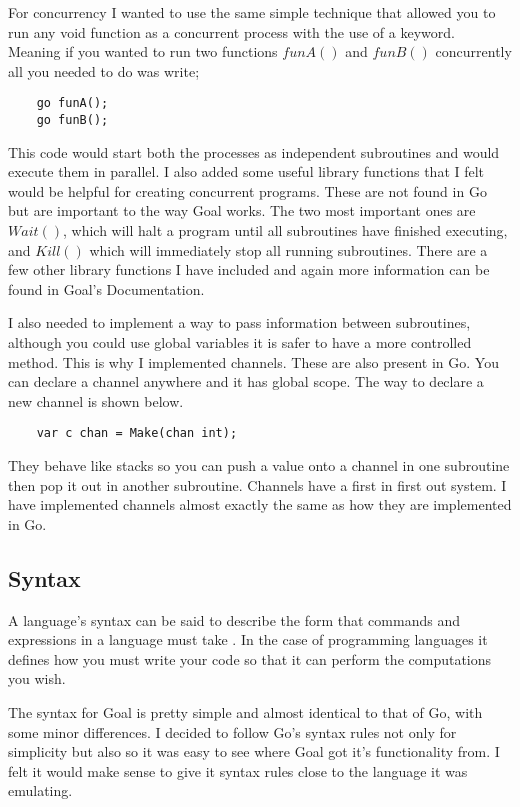 For concurrency I wanted to use the same simple technique that allowed you to run any void function as a concurrent process with the use of a keyword. Meaning if you wanted to run two functions $funA()$ and $funB()$ concurrently all you needed to do was write;

\begin{lstlisting}
	go funA();
	go funB();	
\end{lstlisting}

This code would start both the processes as independent subroutines and would execute them in parallel. I also added some useful library functions that I felt would be helpful for creating concurrent programs. These are not found in Go but are important to the way Goal works. The two most important ones are $Wait()$, which will halt a program until all subroutines have finished executing, and $Kill()$ which will immediately stop all running subroutines. There are a few other library functions I have included and again more information can be found in Goal's Documentation.  

I also needed to implement a way to pass information between subroutines, although you could use global variables it is safer to have a more controlled method. This is why I implemented channels. These are also present in Go. You can declare a channel anywhere and it has global scope. The way to declare a new channel is shown below.

\begin{lstlisting}
	var c chan = Make(chan int);	
\end{lstlisting}

They behave like stacks so you can push a value onto a channel in one subroutine then pop it out in another subroutine. Channels have a first in first out system. I have implemented channels almost exactly the same as how they are implemented in Go. 

\subsection{Syntax}

A language's syntax can be said to describe the form that commands and expressions in a language must take \cite[p.~72]{CompGen1997}. In the case of programming languages it defines how you must write your code so that it can perform the computations you wish.

The syntax for Goal is pretty simple and almost identical to that of Go, with some minor differences. I decided to follow Go's syntax rules not only for simplicity but also so it was easy to see where Goal got it's functionality from. I felt it would make sense to give it syntax rules close to the language it was emulating.

